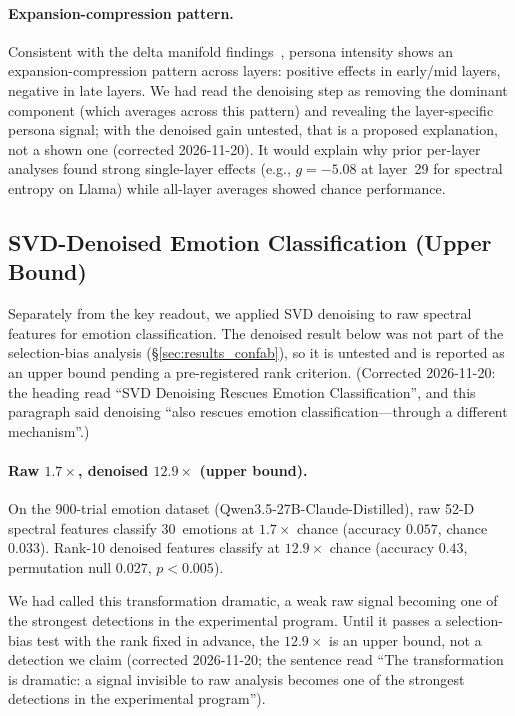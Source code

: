 \documentclass[11pt,a4paper]{article}
\begin{document}
\paragraph{Expansion-compression pattern.} Consistent with the delta
manifold findings~\citep{lyra_delta}, persona intensity shows an
expansion-compression pattern across layers: positive effects in early/mid
layers, negative in late layers. We had read the denoising step as removing
the dominant component (which averages across this pattern) and revealing the
layer-specific persona signal; with the denoised gain untested, that is a
proposed explanation, not a shown one (corrected 2026-11-20). It would
explain why prior per-layer analyses found strong
single-layer effects (e.g., $g = -5.08$ at layer~29 for spectral entropy
on Llama) while all-layer averages showed chance performance.

\subsection{SVD-Denoised Emotion Classification (Upper Bound)}
\label{sec:results_denoise_emo}

Separately from the key readout, we applied SVD denoising to raw spectral
features for emotion classification. The denoised result below was not part
of the selection-bias analysis (\S\ref{sec:results_confab}), so it is
untested and is reported as an upper bound pending a pre-registered rank
criterion. (Corrected 2026-11-20: the heading read ``SVD Denoising Rescues
Emotion Classification'', and this paragraph said denoising ``also rescues
emotion classification---through a different mechanism''.)

\paragraph{Raw $1.7\times$, denoised $12.9\times$ (upper bound).} On the 900-trial emotion dataset
(Qwen3.5-27B-Claude-Distilled), raw 52-D spectral features classify
30~emotions at $1.7\times$ chance (accuracy $0.057$, chance $0.033$).
Rank-10 denoised features classify at $12.9\times$ chance (accuracy $0.43$,
permutation null $0.027$, $p < 0.005$).

We had called this transformation dramatic, a weak raw signal becoming one of
the strongest detections in the experimental program. Until it passes a
selection-bias test with the rank fixed in advance, the $12.9\times$ is an
upper bound, not a detection we claim (corrected 2026-11-20; the sentence
read ``The transformation is dramatic: a signal invisible to raw analysis
becomes one of the strongest detections in the experimental program'').
\end{document}
